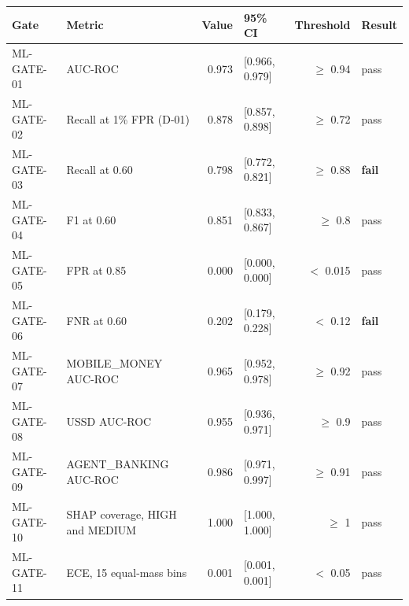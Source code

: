 \begin{tabular}{llrlrl}
\toprule
Gate & Metric & Value & 95\% CI & Threshold & Result \\
\midrule
ML-GATE-01 & AUC-ROC & 0.973 & [0.966, 0.979] & $\geq$ 0.94 & pass \\
ML-GATE-02 & Recall at 1\% FPR (D-01) & 0.878 & [0.857, 0.898] & $\geq$ 0.72 & pass \\
ML-GATE-03 & Recall at 0.60 & 0.798 & [0.772, 0.821] & $\geq$ 0.88 & \textbf{fail} \\
ML-GATE-04 & F1 at 0.60 & 0.851 & [0.833, 0.867] & $\geq$ 0.8 & pass \\
ML-GATE-05 & FPR at 0.85 & 0.000 & [0.000, 0.000] & $<$ 0.015 & pass \\
ML-GATE-06 & FNR at 0.60 & 0.202 & [0.179, 0.228] & $<$ 0.12 & \textbf{fail} \\
ML-GATE-07 & MOBILE_MONEY AUC-ROC & 0.965 & [0.952, 0.978] & $\geq$ 0.92 & pass \\
ML-GATE-08 & USSD AUC-ROC & 0.955 & [0.936, 0.971] & $\geq$ 0.9 & pass \\
ML-GATE-09 & AGENT_BANKING AUC-ROC & 0.986 & [0.971, 0.997] & $\geq$ 0.91 & pass \\
ML-GATE-10 & SHAP coverage, HIGH and MEDIUM & 1.000 & [1.000, 1.000] & $\geq$ 1 & pass \\
ML-GATE-11 & ECE, 15 equal-mass bins & 0.001 & [0.001, 0.001] & $<$ 0.05 & pass \\
\bottomrule
\end{tabular}

